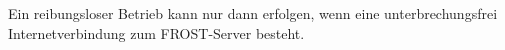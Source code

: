 Ein reibungsloser Betrieb kann nur dann erfolgen, wenn eine unterbrechungsfrei Internetverbindung zum \gls{FROST-Server} besteht.









































































































































%